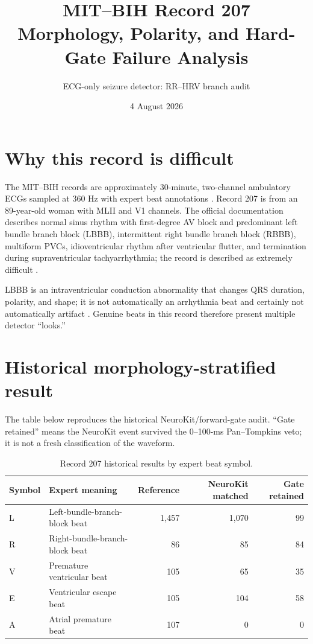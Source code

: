 \documentclass[10pt]{article}
\title{MIT--BIH Record 207\\Morphology, Polarity, and Hard-Gate Failure Analysis}
\author{ECG-only seizure detector: RR--HRV branch audit}
\date{4 August 2026}
\begin{document}
\maketitle


\section{Why this record is difficult}
The MIT--BIH records are approximately 30-minute, two-channel ambulatory ECGs sampled at 360 Hz with expert beat annotations \cite{moody2001mitbih,physionetmitdb,goldberger2000physiobank}. Record 207 is from an 89-year-old woman with MLII and V1 channels. The official documentation describes normal sinus rhythm with first-degree AV block and predominant left bundle branch block (LBBB), intermittent right bundle branch block (RBBB), multiform PVCs, idioventricular rhythm after ventricular flutter, and termination during supraventricular tachyarrhythmia; the record is described as extremely difficult \cite{physionetmitdb}.

LBBB is an intraventricular conduction abnormality that changes QRS duration, polarity, and shape; it is not automatically an arrhythmia beat and certainly not automatically artifact \cite{surawicz2009conduction}. Genuine beats in this record therefore present multiple detector ``looks.''

\section{Historical morphology-stratified result}
The table below reproduces the historical NeuroKit/forward-gate audit. ``Gate retained'' means the NeuroKit event survived the 0--100-ms Pan--Tompkins veto; it is not a fresh classification of the waveform.

\begin{table}[H]
\centering
\caption{Record 207 historical results by expert beat symbol.}
\begin{tabular}{@{}llrrr@{}}
\toprule
Symbol & Expert meaning & Reference & NeuroKit matched & Gate retained\\
\midrule
L & Left-bundle-branch-block beat & 1,457 & 1,070 & 99\\
R & Right-bundle-branch-block beat & 86 & 85 & 84\\
V & Premature ventricular beat & 105 & 65 & 35\\
E & Ventricular escape beat & 105 & 104 & 58\\
A & Atrial premature beat & 107 & 0 & 0\\
\bottomrule
\end{tabular}
\end{table}
\end{document}
